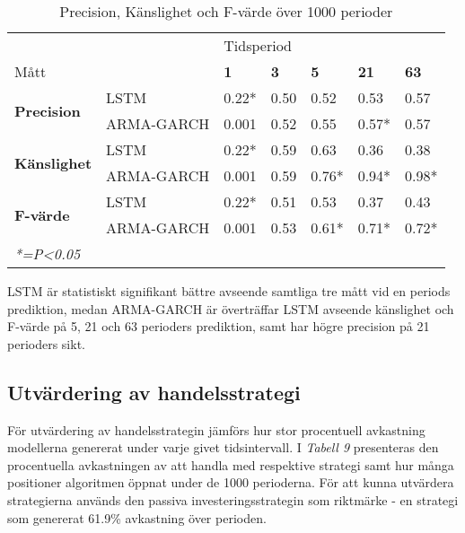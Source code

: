 \documentclass[11pt]{article}
\begin{document}
\begin{table}[H]
\caption{Precision, Känslighet och F-värde över 1000 perioder}
\begin{tabular}{||lllllll||}
\hline
                                     &            & \multicolumn{5}{l||}{Tidsperiod}                                  \\
Mått                                 &            & \textbf{1} & \textbf{3} & \textbf{5} & \textbf{21} & \textbf{63} \\ \hline\hline
\multirow{2}{*}{\textbf{Precision}} & LSTM       & 0.22*          & 0.50       & 0.52       & 0.53        & 0.57        \\
                                     & ARMA-GARCH & 0.001          & 0.52       & 0.55       & 0.57*        & 0.57        \\ \cline{2-7} 
\multirow{2}{*}{\textbf{Känslighet}}  & LSTM       & 0.22*          & 0.59          & 0.63          & 0.36           & 0.38      \\
                                     & ARMA-GARCH & 0.001          & 0.59          & 0.76*          & 0.94*           & 0.98*           \\ \cline{2-7} 
\multirow{2}{*}{\textbf{F-värde}}    & LSTM       & 0.22*          & 0.51        & 0.53       & 0.37       & 0.43        \\
                                     & ARMA-GARCH & 0.001          & 0.53        & 0.61*       & 0.71*       & 0.72*        \\ \hline
\multicolumn{5}{l}{\textit{*=P\textless{}0.05}}
\end{tabular}
\end{table}

LSTM är statistiskt signifikant bättre avseende samtliga tre mått vid en periods prediktion, medan ARMA-GARCH är överträffar LSTM avseende känslighet och F-värde på 5, 21 och 63 perioders prediktion, samt har högre precision på 21 perioders sikt.


\subsection{Utvärdering av handelsstrategi}
För utvärdering av handelsstrategin jämförs hur stor procentuell avkastning modellerna genererat under varje givet tidsintervall. I \emph{Tabell 9} presenteras den procentuella avkastningen av att handla med respektive strategi samt hur många positioner algoritmen öppnat under de 1000 perioderna. För att kunna utvärdera strategierna används den passiva investeringsstrategin som riktmärke - en strategi som genererat 61.9\% avkastning över perioden.
\end{document}
